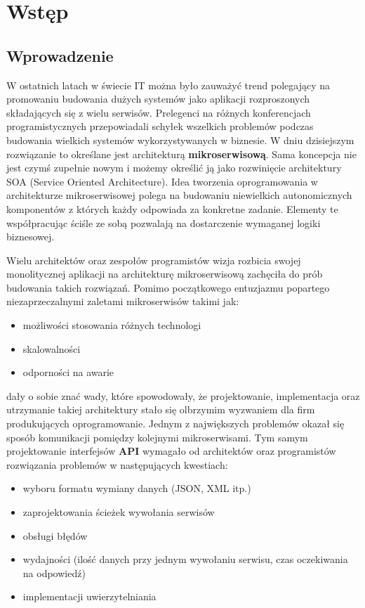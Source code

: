 \chapter{Wstęp}
\section{Wprowadzenie}
W ostatnich latach w świecie IT można było zauważyć trend polegający na promowaniu budowania dużych systemów jako aplikacji rozproszonych składających się z wielu serwisów. Prelegenci na różnych konferencjach programistycznych przepowiadali schyłek wszelkich problemów podczas budowania wielkich systemów wykorzystywanych w biznesie. W dniu dzisiejszym rozwiązanie to określane jest architekturą \textbf{mikroserwisową}. Sama koncepcja nie jest czymś zupełnie nowym i możemy określić ją jako rozwinięcie architektury SOA (Service Oriented Architecture). Idea tworzenia oprogramowania w architekturze mikroserwisowej polega na budowaniu niewielkich autonomicznych komponentów z których każdy odpowiada za konkretne zadanie. Elementy te współpracując ściśle ze sobą pozwalają na dostarczenie wymaganej logiki biznesowej. \par Wielu architektów oraz zespołów programistów wizja rozbicia swojej monolitycznej aplikacji na architekturę mikroserwisową zachęciła do prób budowania takich rozwiązań. Pomimo początkowego entuzjazmu popartego niezaprzeczalnymi zaletami mikroserwisów takimi jak:
\begin{itemize}
	\item możliwości stosowania różnych technologi
	\item skalowalności
	\item odporności na awarie
\end{itemize}
dały o sobie znać wady, które spowodowały, że projektowanie, implementacja oraz utrzymanie takiej architektury stało się olbrzymim wyzwaniem dla firm produkujących oprogramowanie. Jednym z największych problemów okazał się sposób komunikacji pomiędzy kolejnymi mikroserwisami. Tym samym projektowanie interfejsów \textbf{API} wymagało od architektów oraz programistów rozwiązania problemów w następujących kwestiach:
\begin{itemize}
	\item wyboru formatu wymiany danych (JSON, XML itp.)
	\item zaprojektowania ścieżek wywołania serwisów
	\item obsługi błędów
	\item wydajności (ilość danych przy jednym wywołaniu serwisu, czas oczekiwania na odpowiedź)
	\item implementacji uwierzytelniania
\end{itemize}
